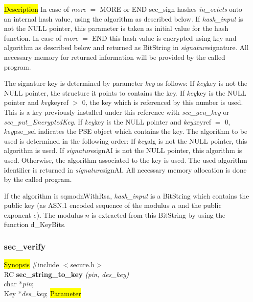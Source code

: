 



\hl{Description}
In case of {\em more} $=$ MORE or END sec\_sign hashes {\em in\_octets} onto
an internal hash value, using the algorithm as described below.
If {\em hash\_input} is not the NULL pointer, this parameter is taken
as initial value for the hash function.
In case of {\em more} $=$ END this hash value is encrypted using key and
algorithm as described below and returned as BitString in {\em signature}\pf signature.
All necessary memory for returned information will be provided by the
called program. 

The signature key is determined by parameter {\em key} as follows:
\be
\m If {\em key}\pf key is not the NULL pointer, the structure it points to
   contains the key.
\m If {\em key}\pf key is the NULL pointer and {\em key}\pf keyref $>$ 0,
   the key which is referenced by this number is used. This is a key
   previously installed under this reference with {\em sec\_gen\_key} or 
   {\em sec\_put\_EncryptedKey}.
\m If {\em key}\pf key is the NULL pointer and {\em key}\pf keyref $=$ 0,
   {\em key}\pf pse\_sel indicates the PSE object which contains the key.
\ee
The algorithm to be used is determined in the following order:
\be
\m If {\em key}\pf alg is not the NULL pointer, this algorithm
   is used.
\m If {\em signature}\pf signAI is not the NULL pointer, this algorithm
   is used.
\m Otherwise, the algorithm associated to the key is used.
\ee
   The used algorithm identifier 
   is returned in {\em signature}\pf signAI.
   All necessary memory allocation is done by the called program.

If the algorithm is sqmodnWithRsa, {\em hash\_input} is a BitString which contains the 
public key (as ASN.1 encoded sequence of the modulus $n$ and the public
exponent $e$). The modulus $n$ is extracted from this BitString by using the function
d\_KeyBits.

\subsubsection{sec\_verify}
\label{sec_string_to_key}
\hl{Synopsis}
\#include $<$secure.h$>$ \\ [0.5cm]
RC {\bf sec\_string\_to\_key} {\em (pin, des\_key)} \\
char *{\em pin}; \\
Key *{\em des\_key};
\hl{Parameter}


